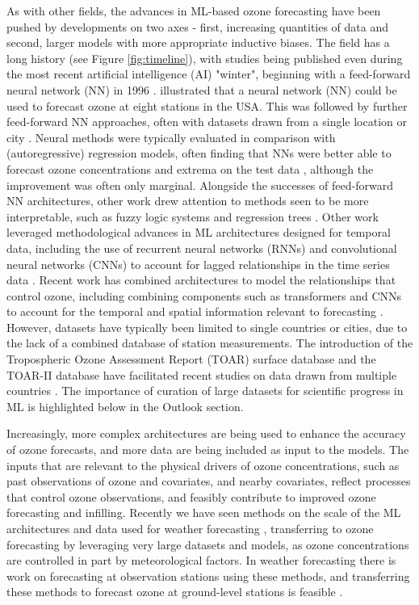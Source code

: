 \documentclass[gmd, manuscript]{copernicus}
\begin{document}
As with other fields, the advances in ML-based ozone forecasting have been pushed by developments on two axes - first, increasing quantities of data and second, larger models with more appropriate inductive biases. The field has a long history (see Figure \ref{fig:timeline}), with studies being published even during the most recent artificial intelligence (AI) "winter", beginning with a feed-forward neural network (NN) in 1996 \citep{Yi1996}. \citet{Comrie1997} illustrated that a neural network (NN) could be used to forecast ozone at eight stations in the USA. This was followed by further feed-forward NN approaches, often with datasets drawn from a single location or city \citep{cobourn_comparison_2000, Kolehmainen2001}. Neural methods were typically evaluated in comparison with (autoregressive) regression models, often finding that NNs were better able to forecast ozone concentrations and extrema on the test data \cite{Nunnari1998, Schlink2003, Chaloulakou2003}, although the improvement was often only marginal. Alongside the successes of feed-forward NN architectures, other work drew attention to methods seen to be more interpretable, such as fuzzy logic systems and regression trees \citep{Gardner2000, heo_new_2004}. Other work leveraged methodological advances in ML architectures designed for temporal data, including the use of recurrent neural networks (RNNs) and convolutional neural networks (CNNs) to account for lagged relationships in the time series data \citep{Eslami2020, sayeed_novel_2021, Kleinert2021}. Recent work has combined architectures to model the relationships that control ozone, including combining components such as transformers and CNNs to account for the temporal and spatial information relevant to forecasting \citep{Chen2022, cheng_spatio-temporal_2022, han_capability_2023}. However, datasets have typically been limited to single countries or cities, due to the lack of a combined database of station measurements. The introduction of the Tropospheric Ozone Assessment Report (TOAR) surface database \citep{Schultz2017} and the TOAR-II database have facilitated recent studies on data drawn from multiple countries \citep{leufen_o3resnet_2023, Hickman2023}. The importance of curation of large datasets for scientific progress in ML is highlighted below in the Outlook section. 

Increasingly, more complex architectures are being used to enhance the accuracy of ozone forecasts, and more data are being included as input to the models. The inputs that are relevant to the physical drivers of ozone concentrations, such as past observations of ozone and covariates, and nearby covariates, reflect processes that control ozone observations, and feasibly contribute to improved ozone forecasting and infilling. Recently we have seen methods on the scale of the ML architectures and data used for weather forecasting \citep{bi_accurate_2023, lam_learning_2023}, transferring to ozone forecasting by leveraging very large datasets and models, as ozone concentrations are controlled in part by meteorological factors. In weather forecasting there is work on forecasting at observation stations using these methods, and transferring these methods to forecast ozone at ground-level stations is feasible \citep{manshausen_generative_2024}. 
\end{document}
